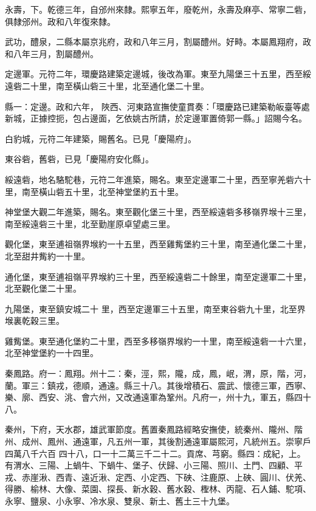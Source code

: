 \begin{pinyinscope}
 永壽，下。乾德三年，自邠州來隸。熙寧五年，廢乾州，永壽及麻亭、常寧二砦，俱隸邠州。政和八年復來隸。



 武功，醴泉，二縣本屬京兆府，政和八年三月，割屬醴州。好畤。本屬鳳翔府，政和八年三月，割屬醴州。



 定邊軍。元符二年，環慶路建築定邊城，後改為軍。東至九陽堡三十五里，西至綏遠砦二十里，南至橫山砦三十里，北至通化堡二十里。



 縣一：定邊。政和六年，
 陜西、河東路宣撫使童貫奏：「環慶路已建築勒皈臺等處新城，正據控扼，包占邊面，乞依姚古所請，於定邊軍置倚郭一縣。」詔賜今名。



 白豹城，元符二年建築，賜舊名。已見「慶陽府」。



 東谷砦，舊砦，已見「慶陽府安化縣」。



 綏遠砦，地名駱駝巷，元符二年進築，賜名。東至定邊軍二十里，西至寧羌砦六十里，南至橫山砦五十里，北至神堂堡約五十里。



 神堂堡大觀二年進築，賜名。東至觀化堡三十里，西至綏遠砦多移嶺界堠十三里，南至綏遠砦三十里，北至勤崖原卓望處三里。



 觀化堡，東至逋祖嶺界堠約一十五里，西至雞觜堡約三十里，南至通化堡二十里，北至甜井觜約一十里。



 通化堡，東至逋祖嶺平界堠約三十里，西至綏遠砦二十餘里，南至定邊軍二十里，北至觀化堡二十里。



 九陽堡，東至鎮安城二十
 里，西至定邊軍三十五里，南至東谷砦九十里，北至界堠裏乾穀三里。



 雞觜堡。東至通化堡約二十里，西至多移嶺界堠約一十里，南至綏遠砦一十六里，北至神堂堡約一十四里。



 秦鳳路。府一：鳳翔。州十二：秦，涇，熙，隴，成，鳳，岷，渭，原，階，河，蘭。軍三：鎮戎，德順，通遠。縣三十八。其後增積石、震武、懷德三軍，西寧、樂、廓、西安、洮、會六州，又改通遠軍為鞏州。凡府一，州十九，軍五，縣四十八。



 秦州，下府，天水郡，雄武軍節度。舊置秦鳳路經略安撫使，統秦州、隴州、階州、成州、鳳州、通遠軍，凡五州一軍，其後割通遠軍屬熙河，凡統州五。崇寧戶四萬八千六百
 四十八，口一十二萬三千二十二。貢席、芎窮。縣四：成紀，上。有渭水、三陽、上蝸牛、下蝸牛、堡子、伏歸、小三陽、照川、土門、四顧、平戎、赤崖湫、西青、遠近湫、定西、小定西、下硤、注鹿原、上硤、圓川、伏羌、得勝、榆林、大像、菜園、探長、新水穀、舊水穀、檉林、丙龍、石人鋪、駝項、永寧、鹽泉、小永寧、冷水泉、雙泉、新土、舊土三十九堡。




\end{pinyinscope}
